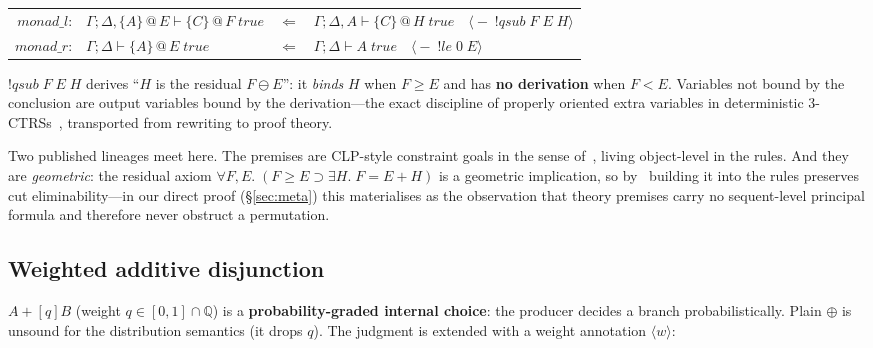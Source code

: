 \documentclass[11pt]{article}
\makeatletter
\newcommand{\lax}[2]{\{#1\}\mathbin{@}#2}       %
\newcommand{\res}{\mathbin{\ominus}}             %
\newcommand{\adddisj}{\oplus}                    %
\newcommand{\tr}{\;\mathit{true}}                %
\newcommand{\laxjdg}[1]{\;\mathit{lax}@{#1}}    %
\newcommand{\QQ}{\mathbb{Q}}                     %
\newcommand{\thprem}[1]{\langle\!\!\!-\;#1\rangle}  %
\newcommand{\wop}[1]{+[{#1}]}                   %
\theoremstyle{definition}
\theoremstyle{remark}
\makeatother
\begin{document}
\medskip
\begin{center}
\small
\begin{tabular}{@{}r@{\;\;}l@{\quad}l@{\quad}l@{}}
$\mathit{monad\_l}$: &
  $\Gamma; \Delta, \lax{A}{E} \vdash \lax{C}{F}\tr$ &
  $\Leftarrow$ &
  $\Gamma; \Delta, A \vdash \lax{C}{H}\tr\quad
   \thprem{!\mathit{qsub}\;F\;E\;H}$ \\[4pt]
$\mathit{monad\_r}$: &
  $\Gamma; \Delta \vdash \lax{A}{E}\tr$ &
  $\Leftarrow$ &
  $\Gamma; \Delta \vdash A\tr\quad
   \thprem{!\mathit{le}\;0\;E}$
\end{tabular}
\end{center}
\medskip

\noindent$!\mathit{qsub}\;F\;E\;H$ derives ``$H$ is the residual $F \res E$'': it
\emph{binds} $H$ when $F \geq E$ and has \textbf{no derivation} when $F < E$.
Variables not bound by the conclusion are output variables bound by the
derivation---the exact discipline of properly oriented extra variables in
deterministic 3-CTRSs~\cite{Ohlebusch2002}, transported from rewriting to proof
theory.

Two published lineages meet here.  The premises are CLP-style constraint goals in
the sense of~\cite{LassezMcAloon1990}, living object-level in the rules.  And they
are \emph{geometric}: the residual axiom $\forall F, E.\;(F \geq E \supset \exists
H.\;F = E + H)$ is a geometric implication, so by~\cite{NegriVonPlato1998}
building it into the rules preserves cut eliminability---in our direct proof
(\S\ref{sec:meta}) this materialises as the observation that theory premises carry
no sequent-level principal formula and therefore never obstruct a permutation.

\subsection{Weighted additive disjunction}
\label{subsec:woplus}

$A \wop{q} B$ (weight $q \in [0,1] \cap \QQ$) is a \textbf{probability-graded
internal choice}: the producer decides a branch probabilistically.  Plain $\adddisj$
is unsound for the distribution semantics (it drops $q$).  The judgment is extended
with a weight annotation $\langle w\rangle$:

\end{document}
